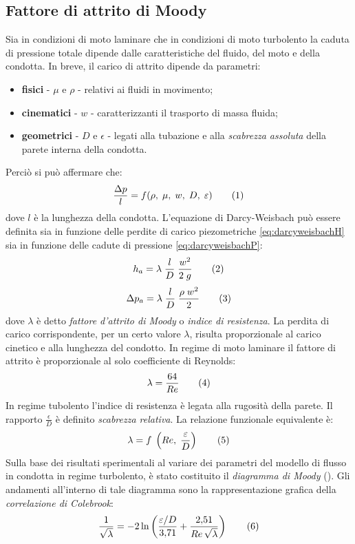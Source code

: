 \subsection{Fattore di attrito di Moody}
Sia in condizioni di moto laminare che in condizioni di moto turbolento la caduta di pressione totale dipende dalle caratteristiche del fluido,  del moto e della condotta. In breve, il carico di attrito dipende da parametri:
\begin{itemize}
    \item \textbf{fisici} - \(\mu\) e \(\rho\) - relativi ai fluidi in movimento;
    \item \textbf{cinematici} - \(w\) - caratterizzanti il trasporto di massa fluida;
    \item \textbf{geometrici} - \(D\) e \(\epsilon\) - legati alla tubazione e alla \textit{scabrezza assoluta} della parete interna della condotta.
\end{itemize}
Perciò si può affermare che:
\[\frac{\Delta p}{l}=f(\rho, \; \mu, \; w, \; D, \; \epsilon) \addtag \label{eq:funzcaduta} \]
dove \(l\) è la lunghezza della condotta. L'equazione di Darcy-Weisbach può essere definita sia in funzione delle perdite di carico piezometriche \eqref{eq:darcyweisbachH} sia in funzione delle cadute di pressione \eqref{eq:darcyweisbachP}:
\[h_a = \lambda \; \frac{l}{D} \; \frac{w^2}{2 \; g} \addtag \label{eq:darcyweisbachH} \]
\[\Delta p_a = \lambda \; \frac{l}{D} \; \frac{\rho \; w^2}{2} \addtag \label{eq:darcyweisbachP} \]
dove \(\lambda\) è detto \textit{fattore d'attrito di Moody} o \textit{indice di resistenza}. La perdita di carico corrispondente, per un certo valore \(\lambda\), risulta proporzionale al carico cinetico e alla lunghezza del condotto. In regime di moto laminare il fattore di attrito è proporzionale al solo coefficiente di Reynolds:
\[\lambda=\frac{64}{Re} \addtag \]
In regime tubolento l'indice di resistenza è legata alla rugosità della parete. Il rapporto \(\frac{\epsilon}{D}\) è definito \textit{scabrezza relativa}. La relazione funzionale equivalente è:
\[\lambda=f \; \left(Re, \; \frac{\epsilon}{D}\right) \addtag \]
Sulla base dei risultati sperimentali al variare dei parametri del modello di flusso in condotta in regime turbolento, è stato costituito il \textit{diagramma di Moody} (). Gli andamenti all'interno di tale diagramma sono la rappresentazione grafica della \textit{correlazione di Colebrook}:
\[ \frac{1}{\sqrt{\lambda}} = - 2 \ln \left( \frac { \epsilon/D} {3{,}71} + \frac {2{,}51} {Re \, \sqrt{\lambda}} \right) \addtag \label{eq:colebrook} \]

